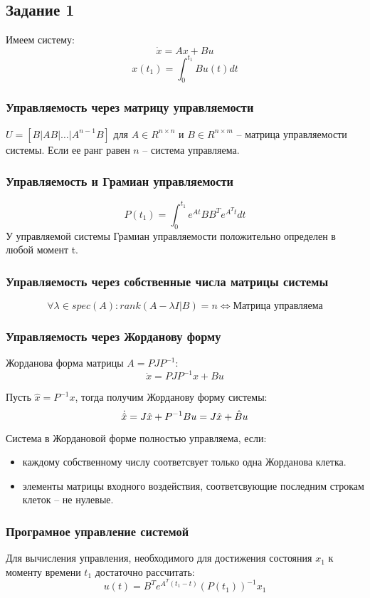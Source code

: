 \subsection{Задание 1}
Имеем систему:
\[\dot{x} = A x + Bu \]
\[x(t_1) = \int_0^{t_1} B u(t) dt\]
\subsubsection{Управляемость через матрицу управляемости}
\(U = [B | AB | \hdots | A^{n-1}B]\) для \(A \in R^{n \times n}\) и \(B \in R^{n \times m}\) -- матрица управляемости системы. Если ее ранг равен \(n\) -- система управляема.

\subsubsection{Управляемость и Грамиан управляемости}
\[P(t_1) = \int_0^{t_1} e^{At} B B^T e^{A^T t} dt\]
У управляемой системы Грамиан управляемости положительно определен в любой момент t.

\subsubsection{Управляемость через собственные числа матрицы системы}
\[\forall \lambda \in spec(A): rank(A - \lambda I | B) = n \Longleftrightarrow \text{Матрица управляема} \]

\subsubsection{Управляемость через Жорданову форму}
Жорданова форма матрицы \(A = P J P^{-1}\):
\[
        \dot{x} = P J P^{-1} x + Bu 
\]

Пусть \(\hat{x} = P^{-1}x\), тогда получим Жорданову форму системы:
\[
        \dot{\hat{x}} = J\hat{x} + P^{-1}Bu = J\hat{x} + \hat{B}u  \\
\]

Система в Жордановой форме полностью управляема, если:
\begin{itemize}
    \item каждому собственному числу соответсвует только одна Жорданова клетка. 
    \item элементы матрицы входного воздействия, соответсвующие последним строкам клеток -- не нулевые.
\end{itemize}

\subsubsection{Програмное управление системой}
Для вычисления управления, необходимого для достижения состояния \(x_1\) к моменту времени \(t_1\) достаточно рассчитать:
\[u(t) = B^T e^{A^T (t_1 - t)} (P(t_1))^{-1} x_1\]



